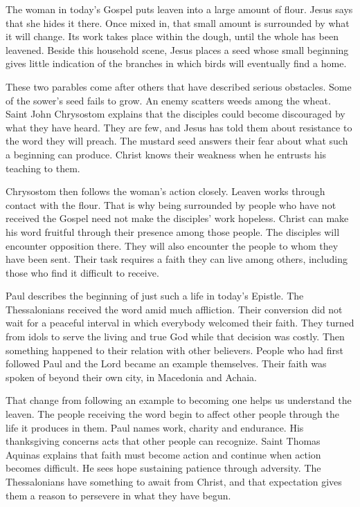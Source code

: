 The woman in today's Gospel puts leaven into a large amount of flour. Jesus says that she hides it there. Once mixed in, that small amount is surrounded by what it will change. Its work takes place within the dough, until the whole has been leavened. Beside this household scene, Jesus places a seed whose small beginning gives little indication of the branches in which birds will eventually find a home.

These two parables come after others that have described serious obstacles. Some of the sower's seed fails to grow. An enemy scatters weeds among the wheat. Saint John Chrysostom explains that the disciples could become discouraged by what they have heard. They are few, and Jesus has told them about resistance to the word they will preach. The mustard seed answers their fear about what such a beginning can produce. Christ knows their weakness when he entrusts his teaching to them.

Chrysostom then follows the woman's action closely. Leaven works through contact with the flour. That is why being surrounded by people who have not received the Gospel need not make the disciples' work hopeless. Christ can make his word fruitful through their presence among those people. The disciples will encounter opposition there. They will also encounter the people to whom they have been sent. Their task requires a faith they can live among others, including those who find it difficult to receive.

Paul describes the beginning of just such a life in today's Epistle. The Thessalonians received the word amid much affliction. Their conversion did not wait for a peaceful interval in which everybody welcomed their faith. They turned from idols to serve the living and true God while that decision was costly. Then something happened to their relation with other believers. People who had first followed Paul and the Lord became an example themselves. Their faith was spoken of beyond their own city, in Macedonia and Achaia.

That change from following an example to becoming one helps us understand the leaven. The people receiving the word begin to affect other people through the life it produces in them. Paul names work, charity and endurance. His thanksgiving concerns acts that other people can recognize. Saint Thomas Aquinas explains that faith must become action and continue when action becomes difficult. He sees hope sustaining patience through adversity. The Thessalonians have something to await from Christ, and that expectation gives them a reason to persevere in what they have begun.

